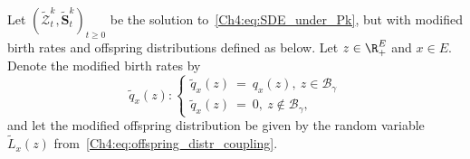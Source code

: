 \begin{refsegment}
 Let  $(\widetilde{\mathcal Z}^k_t,\widetilde{\bm S}^k_t)_{t \geq 0}$ be the solution to~\eqref{Ch4:eq:SDE_under_Pk},
    but with modified birth rates and offspring distributions defined as below. Let $z\in \R_+^E$ and $x\in E$. Denote the modified birth rates by
    \[
   \widetilde q_x(z): \begin{cases} 
       \widetilde q_x(z)\ =\ q_x(z),\ z\in \mathscr{B}_{\gamma}\\ 
       \widetilde q_x(z)\ =\ 0, \ z\notin \mathscr{B}_{\gamma},
    \end{cases}
    \]
    and let the modified offspring distribution be given by the random variable $\widetilde{L}_x(z)$ from~\eqref{Ch4:eq:offspring_distr_coupling}.
  

\end{refsegment}
